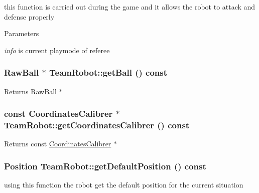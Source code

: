 this function is carried out during the game and it allows the robot to attack and defense properly 


\begin{DoxyParams}{Parameters}
\item[{\em info}]is current playmode of referee \end{DoxyParams}
\hypertarget{classTeamRobot_a86dbc3bbf6fdcebd4ae41a6f68d92a15}{
\subsubsection[{getBall}]{\setlength{\rightskip}{0pt plus 5cm}RawBall $\ast$ TeamRobot::getBall () const}}
\label{classTeamRobot_a86dbc3bbf6fdcebd4ae41a6f68d92a15}
\begin{DoxyReturn}{Returns}
RawBall $\ast$ 
\end{DoxyReturn}
\hypertarget{classTeamRobot_a3ef7d4538226085ed4d92b8bd2fce67d}{
\subsubsection[{getCoordinatesCalibrer}]{\setlength{\rightskip}{0pt plus 5cm}const {\bf CoordinatesCalibrer} $\ast$ TeamRobot::getCoordinatesCalibrer () const}}
\label{classTeamRobot_a3ef7d4538226085ed4d92b8bd2fce67d}
\begin{DoxyReturn}{Returns}
const \hyperlink{classCoordinatesCalibrer}{CoordinatesCalibrer} $\ast$ 
\end{DoxyReturn}
\hypertarget{classTeamRobot_acd11ff6d9651a8deddafa5bd9a30865c}{
\subsubsection[{getDefaultPosition}]{\setlength{\rightskip}{0pt plus 5cm}Position TeamRobot::getDefaultPosition () const}}
\label{classTeamRobot_acd11ff6d9651a8deddafa5bd9a30865c}


using this function the robot get the default position for the current situation 

